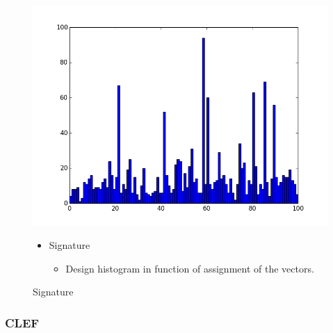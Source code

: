 \documentclass[xcolor=table]{beamer}
\begin{document}
\begin{frame}
\begin{figure}[htbp]
    \begin{minipage}[c]{.40\linewidth}
      \begin{center}
    \includegraphics[scale=0.18]{132_sig.png}
    \caption{Signature}
    \label{fig:Sig}
      \end{center}
    \end{minipage}
    \hfill
    \begin{minipage}[c]{.55\linewidth}
      \begin{center}
        \begin{itemize}
            \item Signature
            \begin{itemize}
                \item Design histogram in function of assignment of the vectors.
            \end{itemize}
        \end{itemize}
      \end{center}
    \end{minipage}
\end{figure}


\end{frame}

\begin{frame} \frametitle{CLEF}

\end{frame}
\end{document}
